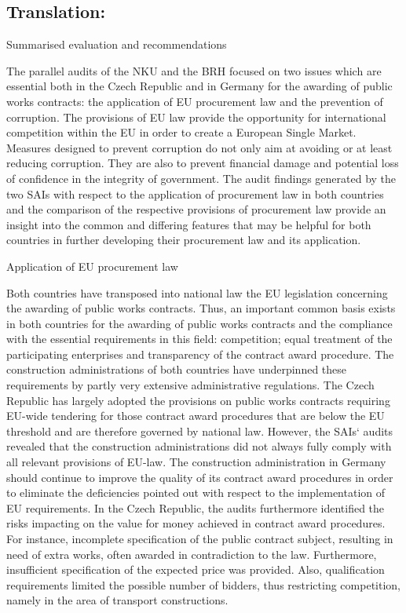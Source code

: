 \documentclass[10pt]{article}
\begin{document}
\pagebreak

\subsection*{Translation:}



Summarised evaluation and recommendations

The parallel audits of the NKU and the BRH focused on two issues which are essential both in the Czech Republic and in Germany for the awarding of public works contracts: the application of EU procurement law and the prevention of corruption.
The provisions of EU law provide the opportunity for international competition within the EU in order to create a European Single Market.
Measures designed to prevent corruption do not only aim at avoiding or at least reducing corruption. They are also to prevent financial damage and potential loss of confidence in the integrity of government.
The audit findings generated by the two SAIs with respect to the application of procurement law in both countries and the comparison of the respective provisions of procurement law provide an insight into the common and differing features that may be helpful for both countries in further developing their procurement law and its application.


Application of EU procurement law

Both countries have transposed into national law the EU legislation concerning the awarding of public works contracts.
Thus, an important common basis exists in both countries for the awarding of public works contracts and the compliance with the essential requirements in this field: competition; equal treatment of the participating enterprises and transparency of the contract award procedure.
The construction administrations of both countries have underpinned these requirements by partly very extensive administrative regulations.
The Czech Republic has largely adopted the provisions on public works contracts requiring EU-wide tendering for those contract award procedures that are below the EU threshold and are therefore governed by national law.
However, the SAIs‘ audits revealed that the construction administrations did not always fully comply with all relevant provisions of EU-law.
The construction administration in Germany should continue to improve the quality of its contract award procedures in order to eliminate the deficiencies pointed out with respect to the implementation of EU requirements.
In the Czech Republic, the audits furthermore identified the risks impacting on the value for money achieved in contract award procedures.
For instance, incomplete specification of the public contract subject, resulting in need of extra works, often awarded in contradiction to the law. Furthermore, insufficient specification of the expected price was provided. Also, qualification requirements limited the possible number of bidders, thus restricting competition, namely in the area of transport constructions.
\end{document}
